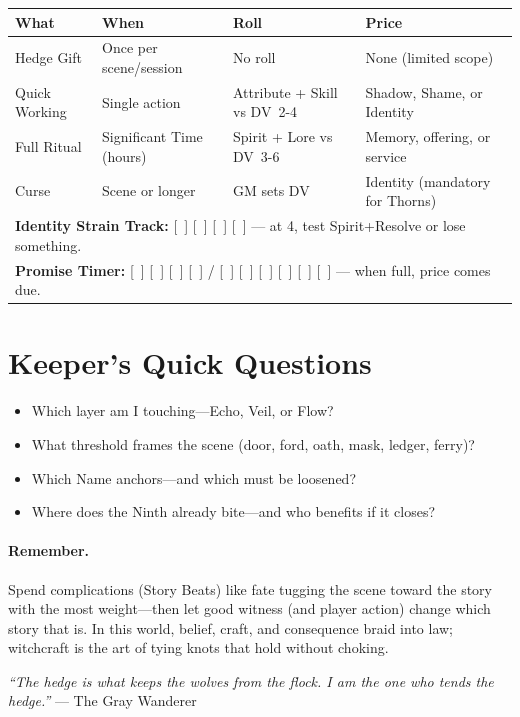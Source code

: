 \documentclass[11pt,letterpaper]{article}
\newcommand{\dv}[1]{\textsc{DV}~#1}
\begin{document}
\begin{table}[H]
\centering
\begin{tabularx}{0.95\linewidth}{@{}lXXX@{}}
\toprule
\textbf{What} & \textbf{When} & \textbf{Roll} & \textbf{Price} \\
\midrule
Hedge Gift & Once per scene/session & No roll & None (limited scope) \\
Quick Working & Single action & Attribute + Skill vs \dv{2-4} & Shadow, Shame, or Identity \\
Full Ritual & Significant Time (hours) & Spirit + Lore vs \dv{3-6} & Memory, offering, or service \\
Curse & Scene or longer & GM sets DV & Identity (mandatory for Thorns) \\
\midrule
\multicolumn{4}{l}{\textbf{Identity Strain Track:} [~] [~] [~] [~] --- at 4, test Spirit+Resolve or lose something.} \\
\multicolumn{4}{l}{\textbf{Promise Timer:} [~] [~] [~] [~] / [~] [~] [~] [~] [~] [~] --- when full, price comes due.} \\
\bottomrule
\end{tabularx}
\end{table}

\section*{Keeper's Quick Questions}

\begin{itemize}
    \item Which layer am I touching---Echo, Veil, or Flow?
    \item What threshold frames the scene (door, ford, oath, mask, ledger, ferry)?
    \item Which Name anchors---and which must be loosened?
    \item Where does the Ninth already bite---and who benefits if it closes?
\end{itemize}

\paragraph{Remember.} Spend complications (Story Beats) like fate tugging the scene toward the story with the most weight---then let good witness (and player action) change which story that is. In this world, belief, craft, and consequence braid into law; witchcraft is the art of tying knots that hold without choking.

\vspace{1em}
\noindent\textit{``The hedge is what keeps the wolves from the flock. I am the one who tends the hedge.''}
\hfill --- The Gray Wanderer
\end{document}
